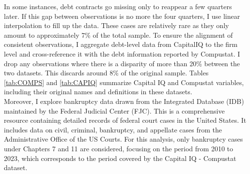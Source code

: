 \documentclass[12pt]{article}
\begin{document}
In some instances, debt contracts go missing only to reappear a few quarters later. If this gap between observations is no more the four quarters, I use linear interpolation to fill up the data. These cases are relatively rare as they only amount to approximately 7\% of the total sample. To ensure the alignment of consistent observations, I aggregate debt-level data from CapitalIQ to the firm level and cross-reference it with the debt information reported by Compustat. I drop any observations where there is a disparity of more than 20\% between the two datasets. This discards around 8\% of the original sample. Tables \ref{tab:COMPS} and \ref{tab:CAPIQ} summarize Capital IQ and Compustat variables, including their original names and definitions in these datasets. \vspace{3mm} \\
Moreover, I explore bankruptcy data drawn from the Integrated Database (IDB) maintained by the Federal Judicial Center (FJC). This is a comprehensive resource containing detailed records of federal court cases in the United States. It includes data on civil, criminal, bankruptcy, and appellate cases from the Administrative Office of the US Courts. For this analysis, only bankruptcy cases under Chapters 7 and 11 are considered, focusing on the period from 2010 to 2023, which corresponds to the period covered by the Capital IQ - Compustat dataset. 
\end{document}

